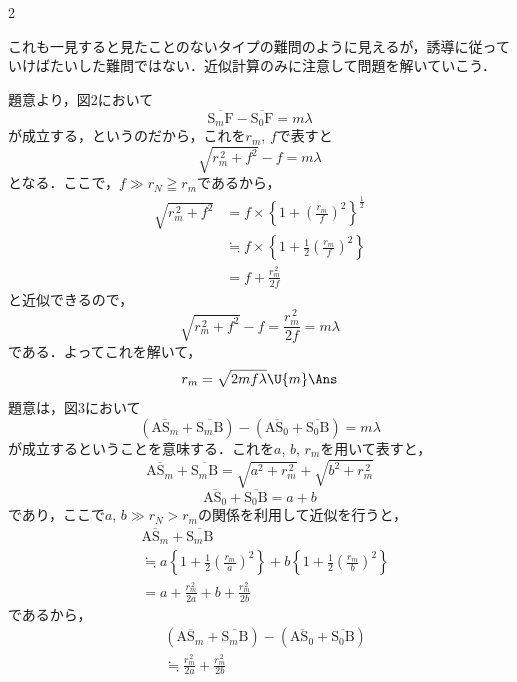 \begin{multicols}{2}
\par\nopagebreak
\begin{sisin}
これも一見すると見たことのないタイプの難問のように見えるが，誘導に従っていけばたいした難問ではない．近似計算のみに注意して問題を解いていこう．
\end{sisin}
\KaiHead
\begin{komon}
 題意より，図2において
       \[\overline{\mathrm{S}_m\mathrm{F}}-\overline{\mathrm{S_0F}}=m\lambda\]
       が成立する，というのだから，これを$r_m$, $f$で表すと
       \[\sqrt{r_m^{\,2}+f^2}-f=m\lambda\]
       となる．ここで，$f\gg r_N\geqq r_m$であるから，
       \begin{align*}
       \sqrt{r_m^{\,2}+f^2}&=f\times\left\{1+\left(\frac{r_m}{f}\right)^2\right\}^{\frac{1}{2}}\\
       &\fallingdotseq f\times\left\{1+\frac{1}{2}\left(\frac{r_m}{f}\right)^2\right\}\\
       &=f+\frac{r_m^{\,2}}{2f}
       \end{align*}
       と近似できるので，
       \[\sqrt{r_m^{\,2}+f^2}-f=\frac{r_m^{\,2}}{2f}=m\lambda\]
       である．よってこれを解いて，
       \[r_m=\sqrt{2mf\lambda}\U{m}\Ans\]
 題意は，図3において
       \[\left(\overline{\mathrm{AS}_m}+\overline{\mathrm{S}_m\mathrm{B}}\right)-\left(\overline{\mathrm{AS_0}}+\overline{\mathrm{S_0B}}\right)=m\lambda\]
       が成立するということを意味する．これを$a$, $b$, $r_m$を用いて表すと，
       \[\overline{\mathrm{AS}_m}+\overline{\mathrm{S}_m\mathrm{B}}=\sqrt{a^2+r_m^{\,2}}+\sqrt{b^2+r_m^{\,2}}\]
       \[\overline{\mathrm{AS_0}}+\overline{\mathrm{S_0B}}=a+b\]
       であり，ここで$a$, $b\gg r_N>r_m$の関係を利用して近似を行うと，
       \begin{align*}
       &\overline{\mathrm{AS}_m}+\overline{\mathrm{S}_m\mathrm{B}}\\
       &\fallingdotseq a\left\{1+\frac{1}{2}\left(\frac{r_m}{a}\right)^2\right\}+b\left\{1+\frac{1}{2}\left(\frac{r_m}{b}\right)^2\right\}\\
       &=a+\frac{r_m^{\,2}}{2a}+b+\frac{r_m^{\,2}}{2b}
       \end{align*}
       であるから，
       \begin{align*}
       &\left(\overline{\mathrm{AS}_m}+\overline{\mathrm{S}_m\mathrm{B}}\right)-\left(\overline{\mathrm{AS_0}}+\overline{\mathrm{S_0B}}\right)\\
       &\fallingdotseq\frac{r_m^{\,2}}{2a}+\frac{r_m^{\,2}}{2b}
       \end{align*}

\end{komon}
\end{multicols}
